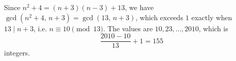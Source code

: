 Since $n^2+4=(n+3)(n-3)+13$, we have $\gcd(n^2+4,\,n+3)=\gcd(13,\,n+3)$, which exceeds $1$ exactly when $13\mid n+3$, i.e. $n\equiv10\pmod{13}$. The values are $10,23,\dots,2010$, which is
\[
\dfrac{2010-10}{13}+1=\boxed{155}
\]
integers.
